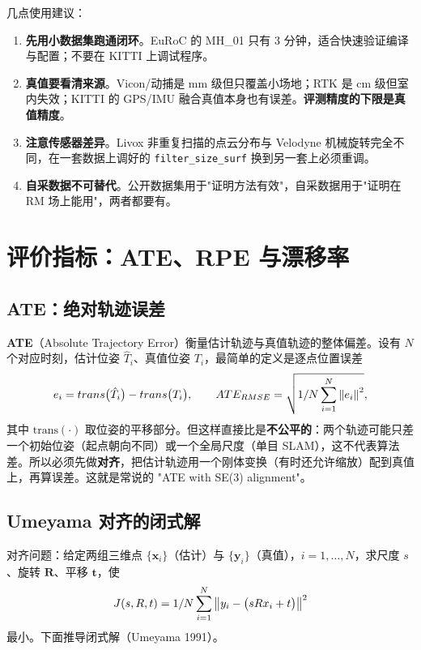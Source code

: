 几点使用建议：

\begin{enumerate}
  \item \textbf{先用小数据集跑通闭环}。EuRoC 的 MH\_01 只有 3 分钟，适合快速验证编译与配置；不要在 KITTI 上调试程序。
  \item \textbf{真值要看清来源}。Vicon/动捕是 mm 级但只覆盖小场地；RTK 是 cm 级但室内失效；KITTI 的 GPS/IMU 融合真值本身也有误差。\textbf{评测精度的下限是真值精度}。
  \item \textbf{注意传感器差异}。Livox 非重复扫描的点云分布与 Velodyne 机械旋转完全不同，在一套数据上调好的 \lstinline{filter_size_surf} 换到另一套上必须重调。
  \item \textbf{自采数据不可替代}。公开数据集用于"证明方法有效"，自采数据用于"证明在 RM 场上能用"，两者都要有。
\end{enumerate}

\section{评价指标：ATE、RPE 与漂移率}\label{sec:28-metrics}

\subsection{ATE：绝对轨迹误差}

\textbf{ATE}（Absolute Trajectory Error）衡量估计轨迹与真值轨迹的整体偏差。设有 $N$ 个对应时刻，估计位姿 $\hat{T}_i$、真值位姿 $T_i$，最简单的定义是逐点位置误差
\begin{equation}
e_i=trans\bigl(\hat{T}_i\bigr)-trans\bigl(T_i\bigr),
\qquad
ATE_{RMSE}=\sqrt{1/N\sum_{i=1}^{N}\left\lVert e_i \right\rVert^{2}},
\label{eq:28-ate}
\end{equation}
其中 $\mathrm{trans}(\cdot)$ 取位姿的平移部分。但这样直接比是\textbf{不公平的}：两个轨迹可能只差一个初始位姿（起点朝向不同）或一个全局尺度（单目 SLAM），这不代表算法差。所以必须先做\textbf{对齐}，把估计轨迹用一个刚体变换（有时还允许缩放）配到真值上，再算误差。这就是常说的 "ATE with SE(3) alignment"。

\subsection{Umeyama 对齐的闭式解}

对齐问题：给定两组三维点 $\{\bm{x}_i\}$（估计）与 $\{\bm{y}_i\}$（真值），$i=1,\dots,N$，求尺度 $s$、旋转 $\bm{R}$、平移 $\bm{t}$，使
\begin{equation}
J(s,R,t)=1/N\sum_{i=1}^{N}\left\lVert y_i-\bigl(sRx_i+t\bigr) \right\rVert^{2}
\label{eq:28-umeyama}
\end{equation}
最小。下面推导闭式解（Umeyama 1991）。

